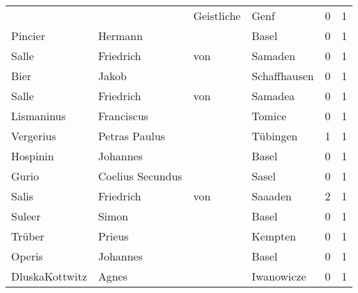 \begin{tabular}{llllrr}
                          &                                    &  Geistliche &                                        Genf &          0 &         1 \\
                  Pincier &                            Hermann &             &                                       Basel &          0 &         1 \\
                    Salle &                          Friedrich &         von &                                     Samaden &          0 &         1 \\
                     Bier &                              Jakob &             &                                Schaffhausen &          0 &         1 \\
                    Salle &                          Friedrich &         von &                                     Samadea &          0 &         1 \\
               Lismaninus &                         Franciscus &             &                                      Tomice &          0 &         1 \\
                Vergerius &                      Petras Paulus &             &                                    Tübingen &          1 &         1 \\
                 Hospinin &                           Johannes &             &                                       Basel &          0 &         1 \\
                    Gurio &                   Coelius Secundus &             &                                       Sasel &          0 &         1 \\
                    Salis &                          Friedrich &         von &                                     Saaaden &          2 &         1 \\
                   Suleer &                              Simon &             &                                       Basel &          0 &         1 \\
                   Trüber &                             Prieus &             &                                     Kempten &          0 &         1 \\
                   Operis &                           Johannes &             &                                       Basel &          0 &         1 \\
           DluskaKottwitz &                              Agnes &             &                                  Iwanowicze &          0 &         1 \\

\end{tabular}
